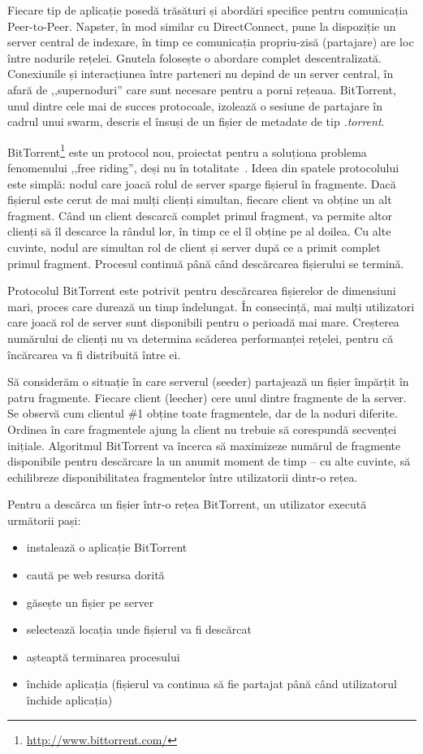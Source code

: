 Fiecare tip de aplicație posedă trăsături și abordări specifice pentru
comunicația Peer-to-Peer. Napster, în mod similar cu DirectConnect,
pune la dispoziție un server central de indexare, în timp ce comunicația
propriu-zisă (partajare) are loc între nodurile rețelei. Gnutela folosește
o abordare complet descentralizată. Conexiunile și interacțiunea
între parteneri nu depind de un server central, în afară de ,,supernoduri''
care sunt necesare pentru a porni rețeaua. BitTorrent, unul dintre cele
mai de succes protocoale, izolează o sesiune de partajare în cadrul unui
swarm, descris el însuși de un fișier de metadate de tip \textit{.torrent}.

BitTorrent\footnote{\url{http://www.bittorrent.com/}} este un protocol nou,
proiectat pentru a soluționa problema fenomenului ,,free riding'', deși nu
în totalitate~\cite{free-riding}. Ideea din spatele protocolului este simplă:
nodul care joacă rolul de server sparge fișierul în fragmente. Dacă fișierul
este cerut de mai mulți clienți simultan, fiecare client va obține un
alt fragment. Când un client descarcă complet primul fragment, va permite
altor clienți să îl descarce la rândul lor, în timp ce el îl obține pe al
doilea. Cu alte cuvinte, nodul are simultan rol de client și server după ce
a primit complet primul fragment. Procesul continuă până când descărcarea
fișierului se termină.

Protocolul BitTorrent este potrivit pentru descărcarea fișierelor de dimensiuni
mari, proces care durează un timp îndelungat. În consecință, mai mulți
utilizatori care joacă rol de server sunt disponibili pentru o perioadă mai
mare. Creșterea numărului de clienți nu va determina scăderea performanței
rețelei, pentru că încărcarea va fi distribuită între ei.

Să considerăm o situație în care serverul (seeder) partajează un fișier
împărțit în patru fragmente. Fiecare client (leecher) cere unul dintre
fragmente de la server. Se observă cum clientul \#1 obține toate fragmentele,
dar de la noduri diferite. Ordinea în care fragmentele ajung la client nu
trebuie să corespundă secvenței inițiale. Algoritmul BitTorrent va încerca
să maximizeze numărul de fragmente disponibile pentru descărcare la un anumit
moment de timp -- cu alte cuvinte, să echilibreze disponibilitatea fragmentelor
între utilizatorii dintr-o rețea.

Pentru a descărca un fișier într-o rețea BitTorrent, un utilizator execută
următorii pași:

\begin{itemize}
  \item instalează o aplicație BitTorrent
  \item caută pe web resursa dorită
  \item găsește un fișier pe server
  \item selectează locația unde fișierul va fi descărcat
  \item așteaptă terminarea procesului
  \item închide aplicația (fișierul va continua să fie partajat
                până când utilizatorul închide aplicația)
\end{itemize}


